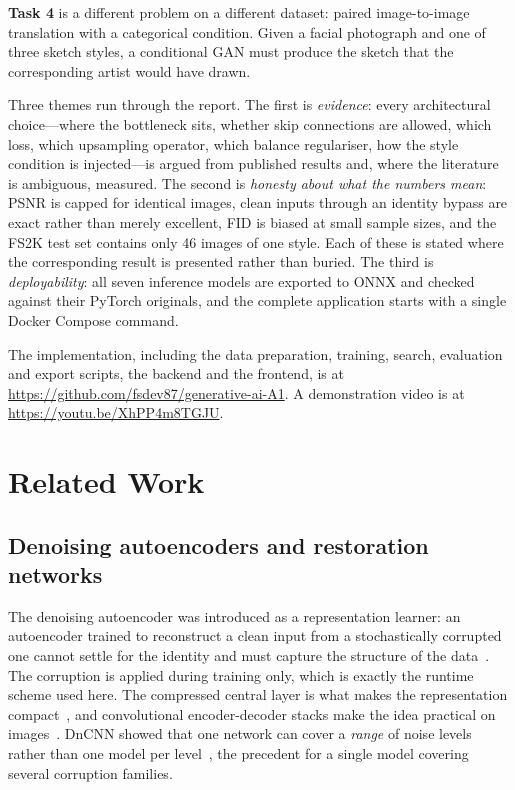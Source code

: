 \documentclass[conference]{IEEEtran}
\newcommand{\repourl}{https://github.com/fsdev87/generative-ai-A1}
\begin{document}
\textbf{Task 4} is a different problem on a different dataset: paired
image-to-image translation with a categorical condition. Given a facial
photograph and one of three sketch styles, a conditional GAN must produce the
sketch that the corresponding artist would have drawn.

Three themes run through the report. The first is \emph{evidence}: every
architectural choice---where the bottleneck sits, whether skip connections are
allowed, which loss, which upsampling operator, which balance regulariser, how
the style condition is injected---is argued from published results and, where
the literature is ambiguous, measured. The second is \emph{honesty about what
the numbers mean}: PSNR is capped for identical images, clean inputs through an
identity bypass are exact rather than merely excellent, FID is biased at small
sample sizes, and the FS2K test set contains only 46 images of one style. Each
of these is stated where the corresponding result is presented rather than
buried. The third is \emph{deployability}: all seven inference models are
exported to ONNX and checked against their PyTorch originals, and the complete
application starts with a single Docker Compose command.

The implementation, including the data preparation, training, search,
evaluation and export scripts, the backend and the frontend, is at
\url{\repourl}. A demonstration video is at
\url{https://youtu.be/XhPP4m8TGJU}.

\section{Related Work}

\subsection{Denoising autoencoders and restoration networks}

The denoising autoencoder was introduced as a representation learner: an
autoencoder trained to reconstruct a clean input from a stochastically corrupted
one cannot settle for the identity and must capture the structure of the
data~\cite{vincent2008denoising,vincent2010stacked}. The corruption is applied
during training only, which is exactly the runtime scheme used here. The
compressed central layer is what makes the representation
compact~\cite{hinton2006reducing}, and convolutional encoder-decoder stacks make
the idea practical on images~\cite{masci2011stacked,xie2012image}. DnCNN showed
that one network can cover a \emph{range} of noise levels rather than one
model per level~\cite{zhang2017beyond}, the precedent for a single model
covering several corruption families.
\end{document}
